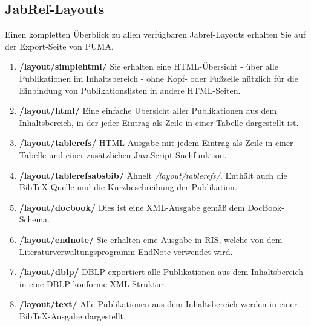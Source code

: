 \subsection{JabRef-Layouts}
Einen kompletten Überblick zu allen verfügbaren Jabref-Layouts erhalten Sie auf der Export-Seite von PUMA.
\begin{enumerate}
	\item  \textbf{/layout/simplehtml/}\newline
	Sie erhalten eine HTML-Übersicht - über alle Publikationen im 		Inhaltsbereich - ohne Kopf- oder Fußzeile nützlich für die 			Einbindung von Publikationslisten in andere HTML-Seiten.
	\item \textbf{/layout/html/}\newline
    Eine einfache Übersicht aller Publikationen aus dem Inhaltsbereich, in der jeder Eintrag als Zeile in einer Tabelle dargestellt ist.
	\item \textbf{/layout/tablerefs/} \newline
    HTML-Ausgabe mit jedem Eintrag als Zeile in einer Tabelle und einer zusätzlichen JavaScript-Suchfunktion.
\item \textbf{/layout/tablerefsabsbib/} \newline
    Ähnelt \textit{/layout/tablerefs/}. Enthält auch die BibTeX-Quelle und die Kurzbeschreibung der Publikation.
\item \textbf{/layout/docbook/} \newline
    Dies ist eine XML-Ausgabe gemäß dem DocBook-Schema.
\item \textbf{/layout/endnote/} \newline
    Sie erhalten eine Ausgabe in RIS, welche von dem Literaturverwaltungsprogramm EndNote verwendet wird.
\item \textbf{/layout/dblp/} \newline
    DBLP exportiert alle Publikationen aus dem Inhaltsbereich in eine DBLP-konforme XML-Struktur. 
\item \textbf{/layout/text/}\newline
    Alle Publikationen aus dem Inhaltsbereich werden in einer BibTeX-Ausgabe dargestellt.
\end{enumerate}

